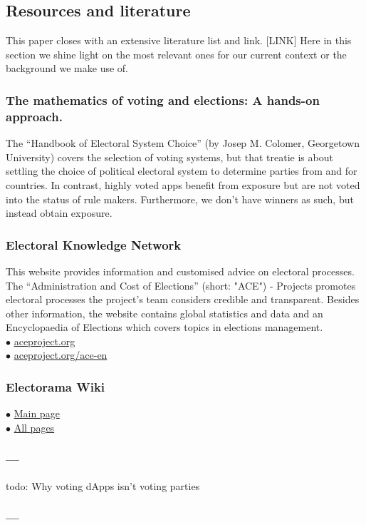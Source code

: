 
\subsection{Resources and literature} 
This paper closes with an extensive literature list and link. [LINK]
Here in this section we shine light on the most relevant ones for our current context or the background we make use of.

\subsubsection{The mathematics of voting and elections: A hands-on approach.}
The ``Handbook of Electoral System Choice'' (by Josep M. Colomer, Georgetown University) covers the selection of voting systems, but that treatie is about settling the choice of political electoral system to determine parties from and for countries. In contrast, highly voted apps benefit from exposure but are not voted into the status of rule makers.
Furthermore, we don't have winners as such, but instead obtain exposure.

\subsubsection{Electoral Knowledge Network} 
This website provides information and customised advice on electoral processes. 
The ``Administration and Cost of Elections'' (short: "ACE") - Projects promotes electoral processes the project's team considers credible and transparent. 
Besides other information, the website contains global statistics and data and an Encyclopaedia of Elections which covers topics in elections management. \\
$\bullet$ \href{http://www.aceproject.org/}{aceproject.org}\\
$\bullet$ \href{http://aceproject.org/ace-en}{aceproject.org/ace-en}

\subsubsection{Electorama Wiki} 
$\bullet$ \href{https://wiki.electorama.com}{Main page}\\
$\bullet$ \href{hhttps://wiki.electorama.com/wiki/Special:AllPages}{All pages}

\subsubsection{---} 
{todo: Why voting dApps isn't voting parties}

\subsubsection{---} 
